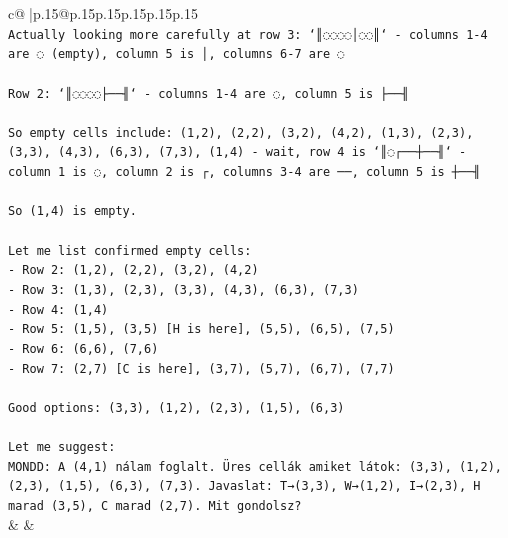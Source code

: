 \documentclass{article}
\begin{document}
{\begin{supertabular}{c@{$\;$}|p{.15\linewidth}@{}p{.15\linewidth}p{.15\linewidth}p{.15\linewidth}p{.15\linewidth}p{.15\linewidth}}
{{{\\ 
\texttt{Actually looking more carefully at row 3: `║◌◌◌◌│◌◌║` {-} columns 1{-}4 are ◌ (empty), column 5 is │, columns 6{-}7 are ◌} \\
\\ 
\texttt{Row 2: `║◌◌◌◌├──╢` {-} columns 1{-}4 are ◌, column 5 is ├──╢} \\
\\ 
\texttt{So empty cells include: (1,2), (2,2), (3,2), (4,2), (1,3), (2,3), (3,3), (4,3), (6,3), (7,3), (1,4) {-} wait, row 4 is `║◌┌──┼──╢` {-} column 1 is ◌, column 2 is ┌, columns 3{-}4 are ──, column 5 is ┼──╢} \\
\\ 
\texttt{So (1,4) is empty.} \\
\\ 
\texttt{Let me list confirmed empty cells:} \\
\texttt{{-} Row 2: (1,2), (2,2), (3,2), (4,2)} \\
\texttt{{-} Row 3: (1,3), (2,3), (3,3), (4,3), (6,3), (7,3)} \\
\texttt{{-} Row 4: (1,4)} \\
\texttt{{-} Row 5: (1,5), (3,5) {[}H is here{]}, (5,5), (6,5), (7,5)} \\
\texttt{{-} Row 6: (6,6), (7,6)} \\
\texttt{{-} Row 7: (2,7) {[}C is here{]}, (3,7), (5,7), (6,7), (7,7)} \\
\\ 
\texttt{Good options: (3,3), (1,2), (2,3), (1,5), (6,3)} \\
\\ 
\texttt{Let me suggest:} \\
\texttt{MONDD: A (4,1) nálam foglalt. Üres cellák amiket látok: (3,3), (1,2), (2,3), (1,5), (6,3), (7,3). Javaslat: T→(3,3), W→(1,2), I→(2,3), H marad (3,5), C marad (2,7). Mit gondolsz?} \\
            }
        }
    }
    & & \\ \\


\end{supertabular}}
\end{document}
